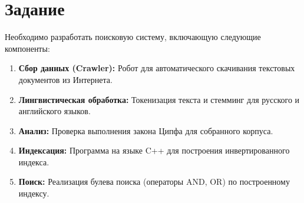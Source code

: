 \section{Задание}

Необходимо разработать поисковую систему, включающую следующие компоненты:
\begin{enumerate}
    \item \textbf{Сбор данных (Crawler):} Робот для автоматического скачивания текстовых документов из Интернета.
    \item \textbf{Лингвистическая обработка:} Токенизация текста и стемминг для русского и английского языков.
    \item \textbf{Анализ:} Проверка выполнения закона Ципфа для собранного корпуса.
    \item \textbf{Индексация:} Программа на языке C++ для построения инвертированного индекса.
    \item \textbf{Поиск:} Реализация булева поиска (операторы AND, OR) по построенному индексу.
\end{enumerate}
